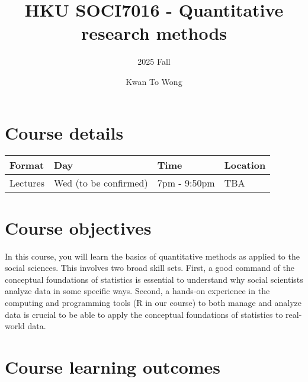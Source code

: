 \documentclass[
  letterpaper,
  DIV=11,
  numbers=noendperiod]{scrartcl}
\title{HKU SOCI7016 - Quantitative research methods}
\subtitle{2025 Fall}
\author{Kwan To Wong}
\date{}
\begin{document}
\maketitle


\section{Course details}\label{course-details}

\begin{longtable}[]{@{}
  >{\raggedright\arraybackslash}p{}
  >{\raggedright\arraybackslash}p{}
  >{\raggedright\arraybackslash}p{}
  >{\raggedright\arraybackslash}p{}@{}}
\toprule\noalign{}
\begin{minipage}[b]{\linewidth}\raggedright
Format
\end{minipage} & \begin{minipage}[b]{\linewidth}\raggedright
Day
\end{minipage} & \begin{minipage}[b]{\linewidth}\raggedright
Time
\end{minipage} & \begin{minipage}[b]{\linewidth}\raggedright
Location
\end{minipage} \\
\midrule\noalign{}
\endhead
\bottomrule\noalign{}
\endlastfoot
Lectures & Wed (to be confirmed) & 7pm - 9:50pm & TBA \\
\end{longtable}

\section{Course objectives}\label{course-objectives}

In this course, you will learn the basics of quantitative methods as
applied to the social sciences. This involves two broad skill sets.
First, a good command of the conceptual foundations of statistics is
essential to understand why social scientists analyze data in some
specific ways. Second, a hands-on experience in the computing and
programming tools (R in our course) to both manage and analyze data is
crucial to be able to apply the conceptual foundations of statistics to
real-world data.

\section{Course learning outcomes}\label{course-learning-outcomes}
\end{document}

